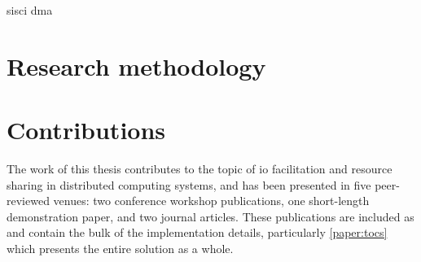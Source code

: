 \gls{sisci}
\gls{dma}

\section{Research methodology}



\section{Contributions}
The work of this thesis contributes to the topic of \gls{io} facilitation and resource sharing in distributed computing systems, and has been presented in five peer-reviewed venues: two conference workshop publications, one short-length demonstration paper, and two journal articles.
These publications are included as  and contain the bulk of the implementation details, particularly \cref{paper:tocs} which presents the entire solution as a whole.

